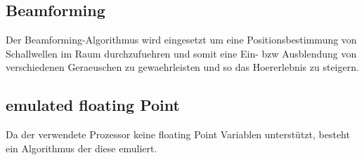 \subsection{Beamforming}
Der Beamforming-Algorithmus wird eingesetzt um eine Positionsbestimmung von Schallwellen im Raum durchzufuehren und somit eine Ein- bzw Ausblendung von verschiedenen Geraeuschen zu gewaehrleisten und so das Hoererlebnis zu steigern. 

\subsection{emulated floating Point}
Da der verwendete Prozessor keine floating Point Variablen unterstützt, besteht ein Algorithmus der diese emuliert. 
